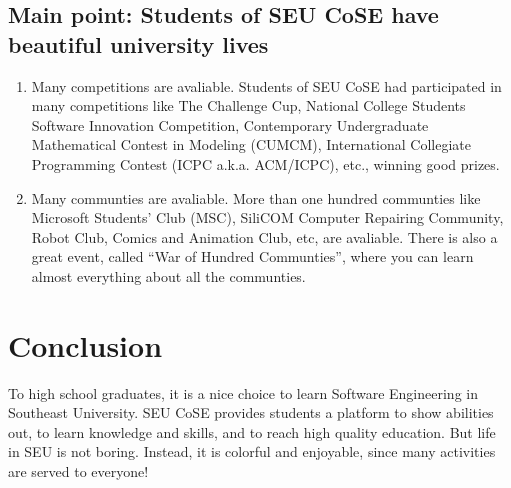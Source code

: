 \documentclass{article}
\begin{document}
    \subsection{Main point: Students of SEU CoSE have beautiful university lives}

    \begin{enumerate}
        \item Many competitions are avaliable. Students of SEU CoSE had participated in many competitions
        like The Challenge Cup, National College Students Software Innovation Competition, Contemporary
        Undergraduate Mathematical Contest in Modeling (CUMCM), International Collegiate Programming Contest
        (ICPC a.k.a. ACM/ICPC), etc., winning good prizes.
        \item Many communties are avaliable. More than one hundred communties like Microsoft Students' Club
        (MSC), SiliCOM Computer Repairing Community, Robot Club, Comics and Animation Club, etc, are avaliable.
        There is also a great event, called ``War of Hundred Communties'', where you can learn almost everything
        about all the communties.
    \end{enumerate}

    \section{Conclusion}

    To high school graduates, it is a nice choice to learn Software Engineering in Southeast University. SEU CoSE
    provides students a platform to show abilities out, to learn knowledge and skills, and to reach high
    quality education. But life in SEU is not boring. Instead, it is colorful and enjoyable, since many activities
    are served to everyone!
\end{document}
